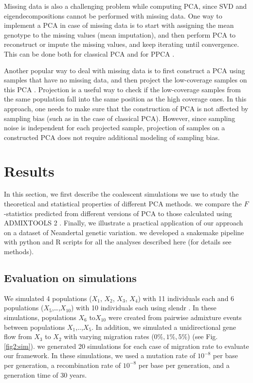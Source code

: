 \documentclass[12pt]{article}
\begin{document}
Missing data is also a challenging problem while computing PCA, since SVD and eigendecompositions cannot be performed with missing data. One way to implement a PCA in case of missing data is to start with assigning the mean genotype to the missing values (mean imputation), and then perform PCA to reconstruct or impute the missing values, and keep iterating until convergence. This can be done both for classical PCA \citep{meisner_large-scale_2021} and for PPCA \citep{tipping_probabilistic_1999-1}.  

Another popular way to deal with missing data is to first construct a PCA using samples that have no missing data, and then project the low-coverage samples on this PCA \citep{patterson_population_2006, price_principal_2006}. Projection is a useful way to check if the low-coverage samples from the same population fall into the same position as the high coverage ones. In this approach, one needs to make sure that the construction of PCA is not affected by sampling bias (such as in the case of classical PCA). However, since sampling noise is independent for each projected sample, projection of samples on a constructed PCA does not require additional modeling of sampling bias. 

\section{Results}
In this section, we first describe the coalescent simulations we use to study the theoretical and statistical properties of different PCA methods. we compare the $F$-statistics predicted from different versions of PCA to those calculated using ADMIXTOOLS 2 \citep{maier_limits_2022}. Finally, we illustrate a practical application of our approach on a dataset of Neandertal genetic variation. we developed a snakemake pipeline \citep{molder_sustainable_2021} with python and R scripts for all the analyses described here (for details see methods).

\subsection{Evaluation on simulations}
We simulated 4 populations ($X_1$, $X_2$, $X_3$, $X_4$) with 11 individuals each and 6 populations ($X_5$,\dots,$X_{10}$) with 10 individuals each using slendr \citep{petr_slendr_2022}. In these simulations, populations $X_6$ to$X_{10}$ were created from pairwise admixture events between populations $X_1$,..,$X_5$. In addition, we simulated a unidirectional gene flow from $X_3$ to $X_2$ with varying migration rates ($0\%, 1\%, 5\%$) (see Fig. \ref{fig2:sim}). we generated 20 simulations for each case of migration rate to evaluate our framework.  In these simulations, we used a mutation rate of $10^{-8}$ per base per generation, a recombination rate of $10^{-8}$ per base per generation, and a generation time of 30 years. 
\end{document}
